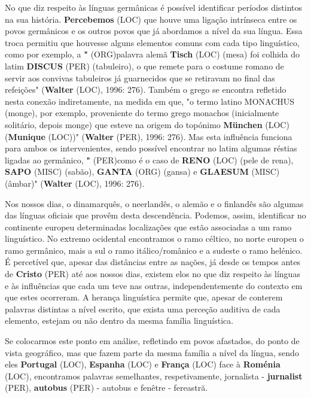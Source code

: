 \documentclass[12pt,a4paper]{article}
\begin{document}
No que diz respeito às línguas germânicas é possível identificar períodos distintos na sua história. \textbf{Percebemos} (LOC) que houve uma ligação intrínseca entre os povos germânicos e  os  outros  povos  que  já  abordamos  a  nível  da  sua  língua.  Essa  troca  permitiu  que houvesse  alguns  elementos  comuns  com  cada  tipo  linguístico,  como  por  exemplo,  a \textbf{"} (ORG)palavra alemã \textbf{Tisch} (LOC) (mesa) foi colhida do latim \textbf{DISCUS} (PER) (tabuleiro), o que remete para o costume romano de servir aos convivas tabuleiros já guarnecidos que se retiravam no final das refeições" (\textbf{Walter} (LOC), 1996: 276). Também o grego se encontra refletido nesta conexão indiretamente, na medida em que, "o termo latino MONACHUS (monge), por exemplo,  proveniente  do  termo  grego monachos (inicialmente  solitário,  depois monge)  que  esteve  na  origem  do  topónimo \textbf{München} (LOC) (\textbf{Munique} (LOC))"  (\textbf{Walter} (PER),  1996: 276). Mas esta influência funciona para ambos os intervenientes, sendo possível encontrar no latim algumas réstias ligadas ao germânico, \textbf{"} (PER)como é o caso de \textbf{RENO} (LOC) (pele de rena), \textbf{SAPO} (MISC) (sabão), \textbf{GANTA} (ORG) (gansa) e \textbf{GLAESUM} (MISC) (âmbar)" (\textbf{Walter} (LOC), 1996: 276).

Nos nossos dias, o dinamarquês, o neerlandês, o alemão e o finlandês são algumas das  línguas  oficiais  que  provêm  desta  descendência.  Podemos,  assim,  identificar  no continente  europeu  determinadas  localizações  que  estão  associadas  a  um  ramo linguístico. No extremo ocidental encontramos o ramo céltico, no norte europeu o ramo germânico, mais a sul o ramo itálico/românico e a sudeste o ramo helénico. É percetível que,  apesar  das  distâncias  entre  as  nações,  já  desde  os  tempos  antes  de  \textbf{Cristo} (PER)  até  aos nossos dias, existem elos no que diz respeito às línguas e às influências que cada um teve nas outras, independentemente do contexto em que estes ocorreram. A herança linguística permite  que,  apesar  de  conterem  palavras  distintas  a  nível  escrito,  que  exista  uma perceção auditiva de cada elemento, estejam ou não dentro da mesma família linguística.

Se colocarmos este ponto em análise, refletindo em povos afastados, do ponto de vista geográfico, mas que fazem parte da mesma família a nível da língua, sendo eles \textbf{Portugal} (LOC), \textbf{Espanha} (LOC) e \textbf{França} (LOC) face  à \textbf{Roménia} (LOC), encontramos  palavras semelhantes, respetivamente, jornalista - \textbf{jurnalist} (PER), \textbf{autobus} (PER) - autobus e fenêtre - fereastră.
\end{document}
